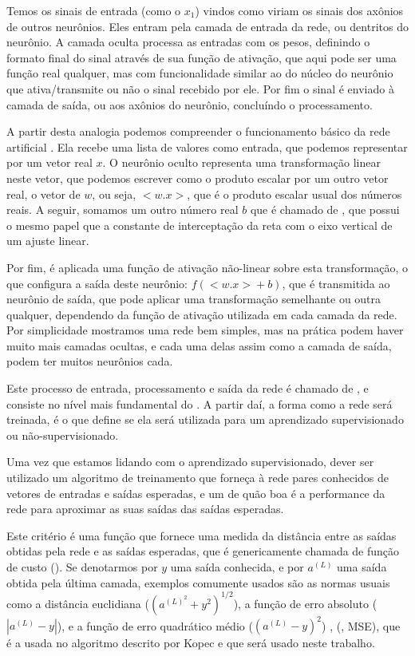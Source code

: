 Temos os sinais de entrada (como o $x_1$) vindos como viriam os sinais dos axônios de outros neurônios. Eles entram pela camada de entrada da rede, ou dentritos do neurônio. A camada oculta processa as entradas com os pesos, definindo o formato final do sinal através de sua função de ativação, que aqui pode ser uma função real qualquer, mas com funcionalidade similar ao do núcleo do neurônio que ativa/transmite ou não o sinal recebido por ele. Por fim o sinal é enviado à camada de saída, ou aos axônios do neurônio, concluíndo o processamento.

A partir desta analogia podemos compreender o funcionamento básico da rede artificial . Ela recebe uma lista de valores como entrada, que podemos representar por um vetor real $x$. O neurônio oculto representa uma transformação linear neste vetor, que podemos escrever como o produto escalar por um outro vetor real, o vetor de  $w$, ou seja, $<w.x>$, que é o produto escalar usual dos números reais. A seguir, somamos um outro número real $b$ que é chamado de , que possui o mesmo papel que a constante de interceptação da reta com o eixo vertical de um ajuste linear.

Por fim, é aplicada uma função de ativação não-linear sobre esta transformação, o que configura a saída deste neurônio: $f({<w.x>} + b)$, que é transmitida ao neurônio de saída, que pode aplicar uma transformação semelhante ou outra qualquer, dependendo da função de ativação utilizada em cada camada da rede. Por simplicidade mostramos uma rede bem simples, mas na prática podem haver muito mais camadas ocultas, e cada uma delas assim como a camada de saída, podem ter muitos neurônios cada.

Este processo de entrada, processamento e saída da rede é chamado de , e consiste no nível mais fundamental do . A partir daí, a forma como a rede será treinada, é o que define se ela será utilizada para um aprendizado supervisionado ou não-supervisionado.

Uma vez que estamos lidando com o aprendizado supervisionado, dever ser utilizado um algoritmo de treinamento que forneça à rede pares conhecidos de vetores de entradas e saídas esperadas, e um  de quão boa é a performance da rede para aproximar as suas saídas das saídas esperadas. 

Este critério é uma função que fornece uma medida da distância entre as saídas obtidas pela rede e as saídas esperadas, que é genericamente chamada de função de custo (). Se denotarmos por $y$ uma saída conhecida, e por $a^{(L)}$ uma saída obtida pela última camada, exemplos comumente usados são as normas usuais como a distância euclidiana ($(a^{(L)^2} + y^2)^{1/2}$), a função de erro absoluto ($|a^{(L)} - y|$), e a função de erro quadrático médio ($(a^{(L)} - y)^2$) , (, MSE), que é a usada no algoritmo descrito por Kopec \citep{classic} e que será usado neste trabalho.

